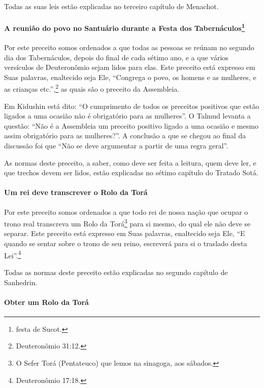 \begin{multicols}{2}
Todas as suas leis estão explicadas no terceiro capítulo de Menachot\starr.

\paragraph{A reunião do povo no Santuário durante a Festa dos
Tabernáculos\protect\footnote{festa de Sucot\starr.}}

Por este preceito somos ordenados a que todas as pessoas se reúnam no
segundo dia dos Tabernáculos, depois do final de cada sétimo ano, e a
que vários versículos de Deuteronômio sejam lidos para elas. Este
preceito está expresso em Suas palavras, enaltecido seja Ele, ``Congrega
o povo, os homens e as mulheres, e as crianças etc.'',\footnote{Deuteronômio
31:12.} as quais são o preceito da Assembleia.

Em Kidushin\starr{} está dito: ``O cumprimento de todos os preceitos positivos
que estão ligados a uma ocasião não é obrigatório para as mulheres''. O
Talmud\starr{} levanta a questão: ``Não é a Assembleia um preceito positivo
ligado a uma ocasião e mesmo assim obrigatório para as mulheres?''. A
conclusão a que se chegou ao final da discussão foi que ``Não se deve
argumentar a partir de uma regra geral''.

As normas deste preceito, a saber, como deve ser feita a leitura, quem
deve ler, e que trechos devem ser lidos, estão explicadas no sétimo
capítulo do Tratado Sotá\starr.

\paragraph{Um rei deve transcrever o Rolo da Torá\starr{}}

Por este preceito somos ordenados a que todo rei de nossa nação que
ocupar o trono real transcreva um Rolo da Torá\starr\footnote{O Sefer Torá\starr{} (Pentateuco) que lemos na sinagoga, aos sábados.}
para si mesmo, do qual ele não deve se separar. Este preceito está
expresso em Suas palavras, enaltecido seja Ele, ``E quando se sentar
sobre o trono de seu reino, escreverá para si o traslado desta Lei''.\footnote{Deuteronômio 17:18.}

Todas as normas deste preceito estão explicadas no segundo capítulo de
Sanhedrin\starr.

\paragraph{Obter um Rolo da Torá\starr{}}


\end{multicols}
